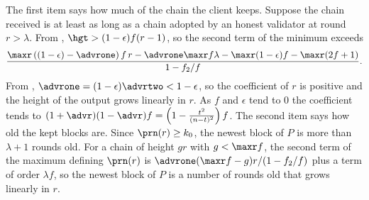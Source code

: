 The first item says how much of the chain the client keeps. Suppose the chain
received is at least as long as a chain adopted by an honest validator at
round $r>\lambda$. From , $\hgt>(1-\epsilon)f(r-1)$, so the
second term of the minimum exceeds
\[
    \frac{\maxr\left((1-\epsilon)-\advrone\right)f\,r
        -\advrone\maxr f\lambda-\maxr(1-\epsilon)f-\maxr(2f+1)}{1-f_2/f}.
\]
From , $\advrone=(1-\epsilon)\advrtwo<1-\epsilon$, so the
coefficient of $r$ is positive and the height of the output grows linearly in
$r$. As $f$ and $\epsilon$ tend to $0$ the coefficient tends to
$(1+\advr)(1-\advr)f=\left(1-\frac{t^2}{(n-t)^2}\right)f$. The second item
says how old the kept blocks are. Since $\prn(r)\ge k_0$, the newest block of
$P$ is more than $\lambda+1$ rounds old. For a chain of height $gr$ with
$g<\maxr f$, the second term of the maximum defining $\prn(r)$ is
$\advrone(\maxr f-g)r/(1-f_2/f)$ plus a term of order $\lambda f$, so the
newest block of $P$ is a number of rounds old that grows linearly in $r$.
